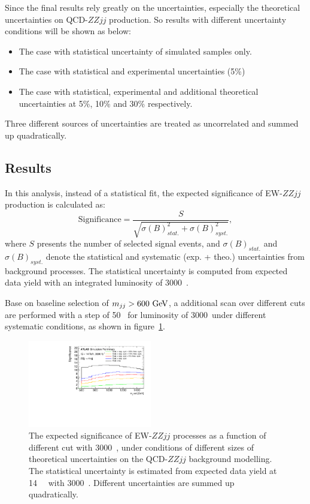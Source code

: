 Since the final results rely greatly on the uncertainties, especially the theoretical uncertainties on QCD-$ZZjj$ production.
So results with different uncertainty conditions will be shown as below:
\begin{itemize}
	\item The case with statistical uncertainty of simulated samples only.
	\item The case with statistical and experimental uncertainties (5\%)
	\item The case with statistical, experimental and additional theoretical uncertainties at 5\%, 10\% and 30\% respectively.
\end{itemize}
Three different sources of uncertainties are treated as uncorrelated and summed up quadratically.

\subsection{Results}

In this analysis, instead of a statistical fit, the expected significance of EW-$ZZjj$ production is calculated as:
\begin{equation}
  \text{Significance} = \frac{S}{\sqrt{\sigma(B)_{stat.}^2 + \sigma(B)_{syst.}^2}},
\end{equation}
where $S$ presents the number of selected signal events,
and $\sigma(B)_{stat.}$ and $\sigma(B)_{syst.}$ denote the statistical and systematic (exp. + theo.) uncertainties from background processes.
The statistical uncertainty is computed from expected data yield with an integrated luminosity of 3000~\ifb.

Base on baseline selection of $m_{jj} > 600~\text{Ge\kern -0.1em V}$, a additional scan over different \mjj cuts are performed with a step of 50~\gev
for luminosity of 3000~\ifb under different systematic conditions, as shown in figure~\ref{fig:mjj_scan}.
\begin{figure}[!htbp]
\centering
\includegraphics[width=0.48\textwidth]{figures/VBSZZ/hllhc/significance_noshape_0_noratio.pdf}
\caption{
The expected significance of EW-$ZZjj$ processes as a function of different \mjj cut with 3000~\ifb,
under conditions of different sizes of theoretical uncertainties on the QCD-$ZZjj$ background modelling.
The statistical uncertainty is estimated from expected data yield at 14~\tev~ with 3000~\ifb.
Different uncertainties are summed up quadratically.
}
\label{fig:mjj_scan}
\end{figure}

